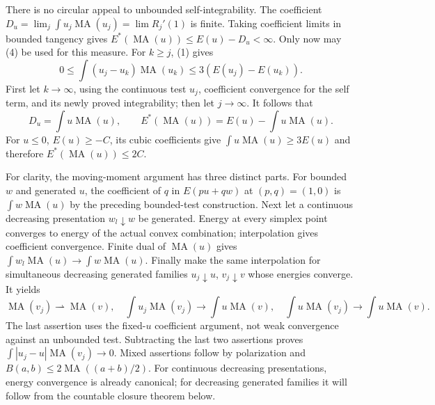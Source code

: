\documentclass[11pt]{article}
\newcommand{\MA}{\operatorname{MA}}
\begin{document}
There is no circular appeal to unbounded self-integrability.
The coefficient $D_u=\lim_j\int u_j\MA(u_j)=\lim R_j'(1)$ is finite.
Taking coefficient limits in bounded tangency gives
$E^*(\MA(u))\le E(u)-D_u<\infty$. Only now may (4) be used for this measure.
For $k\ge j$, (1) gives
\[
 0\le\int(u_j-u_k)\MA(u_k)\le3(E(u_j)-E(u_k)).               \tag{5}
\]
First let $k\to\infty$, using the continuous test $u_j$, coefficient convergence
for the self term, and its newly proved integrability; then let $j\to\infty$.
It follows that
\[
 D_u=\int u\MA(u),\qquad
 E^*(\MA(u))=E(u)-\int u\MA(u).
\]
For $u\le0$, $E(u)\ge-C$, its cubic coefficients give
$\int u\MA(u)\ge3E(u)$ and therefore $E^*(\MA(u))\le2C$.

For clarity, the moving-moment argument has three distinct parts.
For bounded $w$ and generated $u$, the coefficient of $q$ in
$E(pu+qw)$ at $(p,q)=(1,0)$ is $\int w\MA(u)$ by the preceding bounded-test
construction. Next let a continuous decreasing presentation $w_l\downarrow w$
be generated. Energy at every simplex point converges to energy of the
actual convex combination; interpolation gives coefficient convergence.
Finite dual of $\MA(u)$ gives $\int w_l\MA(u)\to\int w\MA(u)$.
Finally make the same interpolation for simultaneous decreasing generated
families $u_j\downarrow u$, $v_j\downarrow v$ whose energies converge.
It yields
\[
 \MA(v_j)\rightharpoonup\MA(v),\quad
 \int u_j\MA(v_j)\to\int u\MA(v),\quad
 \int u\MA(v_j)\to\int u\MA(v).                            \tag{6}
\]
The last assertion uses the fixed-$u$ coefficient argument, not weak convergence
against an unbounded test. Subtracting the last two assertions proves
$\int|u_j-u|\MA(v_j)\to0$. Mixed assertions follow by polarization and
$B(a,b)\le2\MA((a+b)/2)$. For continuous decreasing presentations, energy
convergence is already canonical; for decreasing generated families it will
follow from the countable closure theorem below.
\end{document}
